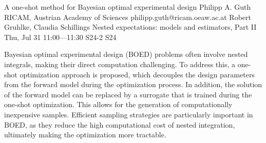 \begin{talk}
  {A one-shot method for Bayesian optimal experimental design}%
  {Philipp A. Guth}%
  {RICAM, Austrian Academy of Sciences}%
  {philipp.guth@ricam.oeaw.ac.at}%
  {Robert Gruhlke, Claudia Schillings}%
  {Nested expectations: models and estimators, Part II}%
  {Thu, Jul 31 11:00---11:30}%
  {S24-2}%
  {S24}%
    
  
Bayesian optimal experimental design (BOED) problems often involve nested integrals, making their direct computation challenging. To address this, a one-shot optimization approach is proposed, which decouples the design parameters from the forward model during the optimization process. In addition, the solution of the forward model can be replaced by a surrogate that is trained during the one-shot optimization. This allows for the generation of computationally inexpensive samples. Efficient sampling strategies are particularly important in BOED, as they reduce the high computational cost of nested integration, ultimately making the optimization more tractable.



%
%
\end{talk}


